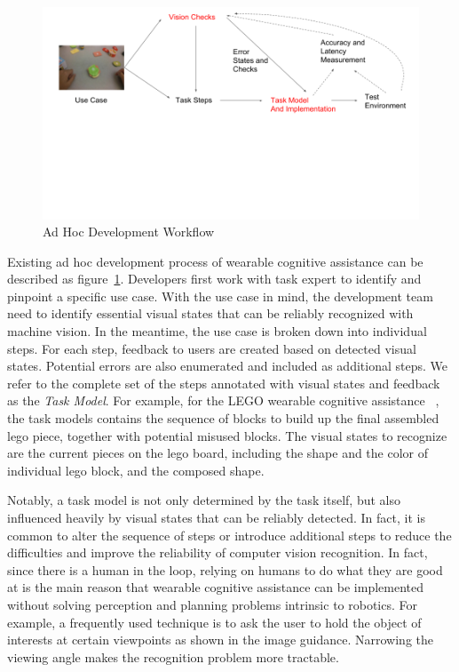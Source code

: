 \begin{figure}
  \centering
  \includegraphics[trim={0 10cm 0 0},width=\linewidth]{FIGS/ad-hoc-workflow}
	\caption{Ad Hoc Development Workflow}
    \label{fig:workflow}
\end{figure}

Existing ad hoc development process of wearable cognitive assistance can be
described as figure~\ref{fig:workflow}. Developers first work with task expert
to identify and pinpoint a specific use case. With the use case in mind, the
development team need to identify essential visual states that can be reliably
recognized with machine vision. In the meantime, the use case is broken down
into individual steps. For each step, feedback to users are created based on
detected visual states. Potential errors are also enumerated and included as
additional steps. We refer to the complete set of the steps annotated with
visual states and feedback as the \textit{Task Model}. For example, for the LEGO
wearable cognitive assistance ~\cite{chen2017empirical}, the task models
contains the sequence of blocks to build up the final assembled lego piece,
together with potential misused blocks. The visual states to recognize are the
current pieces on the lego board, including the shape and the color of
individual lego block, and the composed shape.

Notably, a task model is not only determined by the task itself, but also
influenced heavily by visual states that can be reliably detected. In fact, it
is common to alter the sequence of steps or introduce additional steps to reduce
the difficulties and improve the reliability of computer vision recognition. In
fact, since there is a human in the loop, relying on humans to do what they are
good at is the main reason that wearable cognitive assistance can be implemented
without solving perception and planning problems intrinsic to robotics. For
example, a frequently used technique is to ask the user to hold the object of
interests at certain viewpoints as shown in the image guidance. Narrowing the
viewing angle makes the recognition problem more tractable.

